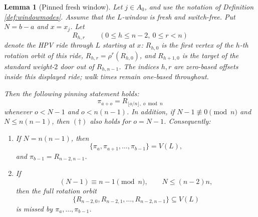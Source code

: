 \documentclass[11pt]{article}
\newtheorem{lemma}[theorem]{Lemma}
\begin{document}
\begin{lemma}[Pinned fresh window]\label{lem:pinned}
Let \(j\in A_0\), and use the notation of Definition \ref{def:windowmodes}.  Assume that the
\(L\)-window is fresh and switch-free.  Put \(N=b-a\) and \(x=x_j\).  Let
\[
  R_{h,r}\qquad(0\le h\le n-2,\ 0\le r<n)
\]
denote the HPV ride through \(L\) starting at \(x\): \(R_{h,0}\) is the first vertex of the
\(h\)-th rotation orbit of this ride, \(R_{h,r}=\rho^r(R_{h,0})\), and
\(R_{h+1,0}\) is the target of the standard weight-\(2\) door out of \(R_{h,n-1}\).
The indices \(h,r\) are zero-based offsets inside this displayed ride; walk times remain
one-based throughout.

Then the following pinning statement holds:
\[
  \pi_{a+o}=R_{\lfloor o/n\rfloor,\;o\bmod n} \tag{$\dagger$}
\]
whenever \(o<N-1\) and \(o<n(n-1)\).  In addition, if \(N-1\not\equiv 0\pmod n\) and
\(N\le n(n-1)\), then \((\dagger)\) also holds for \(o=N-1\).  Consequently:
\begin{enumerate}
\item If \(N=n(n-1)\), then
\[
  \{\pi_a,\pi_{a+1},\ldots,\pi_{b-1}\}=V(L),
\]
and \(\pi_{b-1}=R_{n-2,n-1}\).
\item If
\[
  (N-1)\equiv n-1\pmod n,\qquad N\le (n-2)n,
\]
then the full rotation orbit
\[
  \{R_{n-2,0},R_{n-2,1},\ldots,R_{n-2,n-1}\}\subseteq V(L)
\]
is missed by \(\pi_a,\ldots,\pi_{b-1}\).
\end{enumerate}
\end{lemma}
\end{document}

